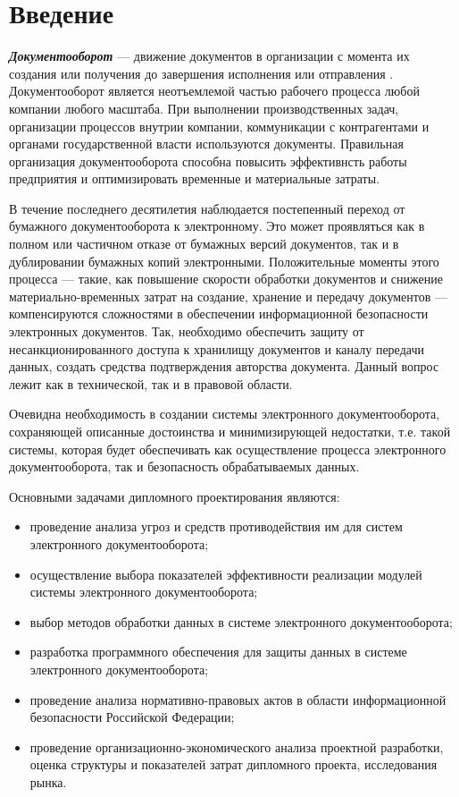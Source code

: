 \chapter*{Введение}							%

\textbf{\textit{Документооборот}} --- движение документов в организации с момента их создания или получения до завершения исполнения или отправления \cite{gost51141}.
Документооборот является неотъемлемой частью рабочего процесса любой компании любого масштаба. При выполнении производственных задач, организации процессов внутрии компании, коммуникации с контрагентами и органами государственной власти используются документы. Правильная организация документооборота способна повысить эффективнсть работы предприятия и оптимизировать временные и материальные затраты.

\vspace{\baselineskip}
В течение последнего десятилетия наблюдается постепенный переход от бумажного документооборота к электронному. Это может проявляться как в полном или частичном отказе от бумажных версий документов, так и в дублировании бумажных копий электронными. Положительные моменты этого процесса --- такие, как повышение скорости обработки документов и снижение материально-временных затрат на создание, хранение и передачу документов --- компенсируются сложностями в обеспечении информационной безопасности электронных документов. Так, необходимо обеспечить защиту от несанкционированного доступа к хранилищу документов и каналу передачи данных, создать средства подтверждения авторства документа. Данный вопрос лежит как в технической, так и в правовой области.

\vspace{\baselineskip}
Очевидна необходимость в создании системы электронного документооборота, сохраняющей описанные достоинства и минимизирующей недостатки, т.е. такой системы, которая будет обеспечивать как осуществление процесса электронного документооборота, так и безопасность обрабатываемых данных.

\vspace{\baselineskip}
Основными задачами дипломного проектирования являются:
\begin{itemize}
  \item проведение анализа угроз и средств противодействия им для систем электронного документооборота;
  \item осуществление выбора показателей эффективности реализации модулей системы электронного документооборота;
  \item выбор методов обработки данных в системе электронного документооборота;
  \item разработка программного обеспечения для защиты данных в системе электронного документооборота;
  \item проведение анализа нормативно-правовых актов в области информационной безопасности Российской Федерации;
  \item проведение организационно-экономического анализа проектной разработки, оценка структуры и показателей затрат дипломного проекта, исследования рынка.
\end{itemize}

\clearpage
